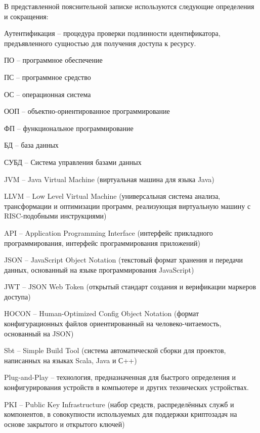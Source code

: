 
В представленной пояснительной записке используются следующие определения и сокращения:

Аутентификация -- процедура проверки подлинности идентификатора, предъявленного сущностью для получения доступа к ресурсу.

ПО -- программное обеспечение

ПС -- программное средство

ОС -- операционная система

ООП -- объектно-ориентированное программирование

ФП -- функциональное программирование

БД -- база данных

СУБД -- Система управления базами данных

JVM -- Java Virtual Machine (виртуальная машина для языка Java)

LLVM -- Low Level Virtual Machine (универсальная система анализа, трансформации и оптимизации программ, реализующая виртуальную машину с RISC-подобными инструкциями)

API -- Application Programming Interface (интерфейс прикладного программирования, интерфейс программирования приложений)

JSON -- JavaScript Object Notation (текстовый формат хранения и передачи данных, основанный на языке программирования JavaScript)

JWT -- JSON Web Token (открытый стандарт создания и верификации маркеров доступа)

HOCON -- Human-Optimized Config Object Notation (формат конфигурационных файлов ориентированный на человеко-читаемость, основанный на JSON)

Sbt -- Simple Build Tool (система автоматической сборки для проектов, написанных на языках Scala, Java и С++)

Plug-and-Play -- технология, предназначенная для быстрого определения и конфигурирования устройств в компьютере и других технических устройствах.

PKI -- Public Key Infrastructure (набор средств, распределённых служб и компонентов, в совокупности используемых для поддержки криптозадач на основе закрытого и открытого ключей)

\clearpage